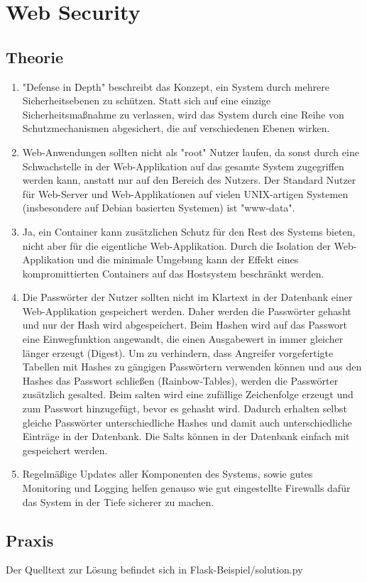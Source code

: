 \documentclass[ngerman]{article}
\begin{document}
\section{Web Security}

\subsection{Theorie}
\begin{enumerate}
    \item "Defense in Depth" beschreibt das Konzept, ein System durch mehrere Sicherheitsebenen zu schützen. Statt sich auf eine einzige Sicherheitsmaßnahme zu verlassen, wird das System durch eine Reihe von Schutzmechanismen abgesichert, die auf verschiedenen Ebenen wirken.
    
    \item Web-Anwendungen sollten nicht als "root" Nutzer laufen, da sonst durch eine Schwachstelle in der Web-Applikation auf das gesamte System zugegriffen werden kann, anstatt nur auf den Bereich des Nutzers. Der Standard Nutzer für Web-Server und Web-Applikationen auf vielen UNIX-artigen Systemen (insbesondere auf Debian basierten Systemen) ist "www-data".
    
    \item Ja, ein Container kann zusätzlichen Schutz für den Rest des Systems bieten, nicht aber für die eigentliche Web-Applikation. Durch die Isolation der Web-Applikation und die minimale Umgebung kann der Effekt eines kompromittierten Containers auf das Hostsystem beschränkt werden.
    
    \item Die Passwörter der Nutzer sollten nicht im Klartext in der Datenbank einer Web-Applikation gespeichert werden. Daher werden die Passwörter gehasht und nur der Hash wird abgespeichert. Beim Hashen wird auf das Passwort eine Einwegfunktion angewandt, die einen Ausgabewert in immer gleicher länger erzeugt (Digest). Um zu verhindern, dass Angreifer vorgefertigte Tabellen mit Hashes zu gängigen Passwörtern verwenden können und aus den Hashes das Passwort schließen (Rainbow-Tables), werden die Passwörter zusätzlich gesalted. Beim salten wird eine zufällige Zeichenfolge erzeugt und zum Passwort hinzugefügt, bevor es gehasht wird. Dadurch erhalten selbst gleiche Passwörter unterschiedliche Hashes und damit auch unterschiedliche Einträge in der Datenbank. Die Salts können in der Datenbank einfach mit gespeichert werden.

    \item Regelmäßige Updates aller Komponenten des Systems, sowie gutes Monitoring und Logging helfen genauso wie gut eingestellte Firewalls dafür das System in der Tiefe sicherer zu machen.
    
\end{enumerate}

\subsection{Praxis}

Der Quelltext zur Lösung befindet sich in Flask-Beispiel/solution.py
\end{document}
